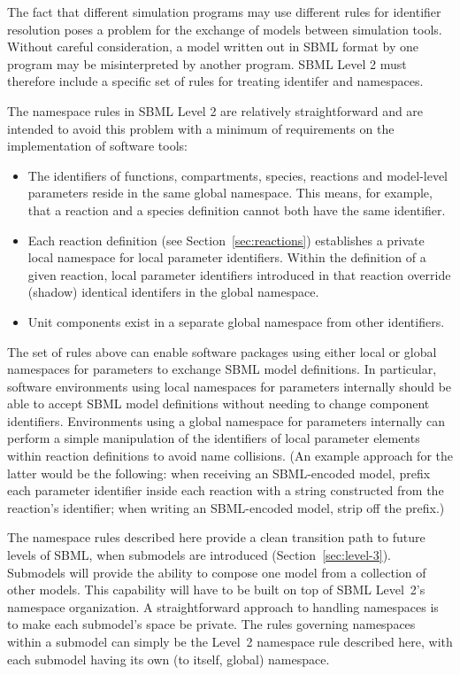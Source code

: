\documentclass[10pt]{cekarticle}
\begin{document}
The fact that different simulation programs may use different
rules for identifier resolution poses a problem for the exchange
of models between simulation tools.  Without careful
consideration, a model written out in SBML format by one program
may be misinterpreted by another program.  SBML Level 2 must
therefore include a specific set of rules for treating identifer
and namespaces.

The namespace rules in SBML Level 2 are relatively straightforward
and are intended to avoid this problem with a minimum of
requirements on the implementation of software tools:
\begin{itemize}

\item The identifiers of functions, compartments, species,
reactions and model-level parameters reside in the same global
namespace. This means, for example, that a reaction and a species
definition cannot both have the same identifier.

\item Each reaction definition (see Section~\ref{sec:reactions})
  establishes a private local namespace for local parameter identifiers. Within the
  definition of a given reaction, local parameter identifiers introduced in that
  reaction override (shadow) identical identifers in the global namespace.

\item Unit components exist in a separate global namespace from
other identifiers.

\end{itemize}

The set of rules above can enable software packages using either
local or global namespaces for parameters to exchange SBML model definitions. In particular, software environments using local namespaces for parameters
internally should be able to accept SBML model definitions without
needing to change component identifiers. Environments using a
global namespace for parameters internally can perform a simple manipulation of the identifiers of local parameter elements within reaction definitions to avoid name collisions.  (An example approach for the latter would be the
following: when receiving an SBML-encoded model, prefix each
parameter identifier inside each reaction with a string constructed from the
reaction's identifier; when writing an SBML-encoded model, strip
off the prefix.)

The namespace rules described here provide a clean transition path
to future levels of SBML, when submodels are introduced
(Section~\ref{sec:level-3}).  Submodels will provide the ability
to compose one model from a collection of other models.  This
capability will have to be built on top of SBML Level~2's
namespace organization.  A straightforward approach to handling
namespaces is to make each submodel's space be private.  The rules
governing namespaces within a submodel can simply be the Level~2
namespace rule described here, with each submodel having its own
(to itself, global) namespace.
\end{document}

